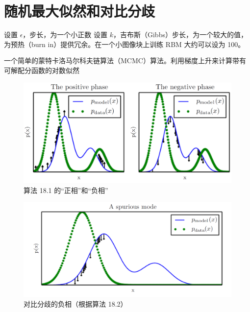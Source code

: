 \section{随机最大似然和对比分歧}
\label{sec:18.2}

\begin{algorithm}
\DontPrintSemicolon
设置 \(\epsilon\)，步长，为一个小正数\;
设置 \(k\)，吉布斯（Gibbs）步长，为一个较大的值，为预热（burn in）提供冗余。在一个小图像块上训练 RBM 大约可以设为 100。\;
\caption{一个简单的蒙特卡洛马尔科夫链算法（MCMC）算法。利用梯度上升来计算带有可解配分函数的对数似然\label{alg:18.1}}
\end{algorithm}

\begin{figure}[htbp] %
   \centering
   \includegraphics[width=\textwidth]{fig/chap18/18_1.png} 
   \caption{算法 18.1 的``正相''和``负相''}
   \label{fig:18.1}
\end{figure}

\begin{figure}[htbp] %
   \centering
   \includegraphics[width=\textwidth]{fig/chap18/18_2.png} 
   \caption{对比分歧的负相（根据算法 18.2）}
   \label{fig:18.2}
\end{figure}

